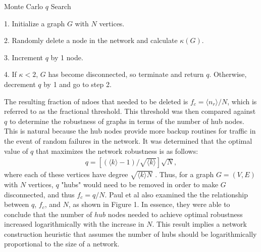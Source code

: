 \documentclass[doc]{apa}%
\begin{document}
\begin{algorithm}
\caption{Monte Carlo $q$ Search}
\label{alg1}
\begin{algorithmic}
	\item 1. Initialize a graph $G$ with $N$ vertices.
	\item 2. Randomly delete a node in the network and calculate $\kappa(G)$.
	\item 3. Increment $q$ by 1 node.
	\item 4. If $\kappa < 2$, $G$ has become disconnected, so terminate and return $q$. Otherwise, decrement $q$ by 1 and go to step 2.
\end{algorithmic}
\end{algorithm}

The resulting fraction of ndoes that needed to be deleted is $f_c = \langle n_r \rangle / N$, which is referred to as the fractional threshold. This threshold was then compared against $q$ to determine the robustness of graphs in terms of the number of hub nodes. This is natural because the hub nodes provide more backup routines for traffic in the event of random failures in the network. It was determined that the optimal value of $q$ that maximizes the network robustness is as follows:
\begin{eqnarray}
q = \left[(\langle k \rangle - 1) / \sqrt{\langle k \rangle}\right]\sqrt{N},
\end{eqnarray}
where each of these vertices have degree $\sqrt{\langle k \rangle N}$ \cite{asd}. Thus, for a graph $G = (V,E)$ with $N$ vertices, $q$ "hubs" would need to be removed in order to make $G$ disconnected, and thus $f_c = q/N$.
Paul et al also examined the the relationship between $q$, $f_c$, and $N$, as shown in Figure 1. In essence, they were able to conclude that the number of $hub$ nodes needed to achieve optimal robustness increased logarithmically with the increase in $N$. This result implies a network construction heuristic that assumes the number of hubs should be logarithmically proportional to the size of a network. 
\end{document}
